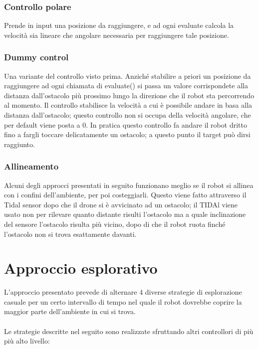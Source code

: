 \documentclass{article}
\begin{document}
\subsubsection{Controllo polare}
Prende in input una posizione da raggiungere, e ad ogni evaluate calcola la velocità sia lineare che angolare necessaria per raggiungere tale posizione.
\subsubsection{Dummy control}
Una variante del controllo visto prima. Anziché stabilire a priori un posizione da raggiungere ad ogni chiamata di evaluate() si passa un valore corrispondete alla distanza dall'ostacolo più prossimo lungo la direzione che il robot sta percorrendo al momento.
Il controllo stabilisce la velocità a cui è possibile andare in basa alla distanza dall'ostacolo; questo controllo non si occupa della velocità angolare, che per default viene posta a 0. In pratica questo controllo fa andare il robot dritto fino a fargli toccare delicatamente un ostacolo; a questo punto il target può dirsi raggiunto.
\subsubsection{Allineamento}
Alcuni degli approcci presentati in seguito funzionano meglio se il robot si allinea con i confini dell'ambiente, per poi costeggiarli. Questo viene fatto attraverso il Tidal sensor dopo che il drone si è avvicinato ad un ostacolo; il TIDAl viene usato non per rilevare quanto distante risulti l'ostacolo ma a quale inclinazione del sensore l'ostacolo risulta più vicino, dopo di che il robot ruota finché l'ostacolo non si trova esattamente davanti.

\section{Approccio esplorativo}
L'approccio presentato prevede di alternare 4 diverse strategie di esplorazione casuale per un certo intervallo di tempo nel quale il robot dovrebbe coprire la maggior parte dell'ambiente in cui si trova.

\paragraph{}
Le strategie descritte nel seguito sono realizzate sfruttando altri controllori di più più alto livello:
\end{document}
